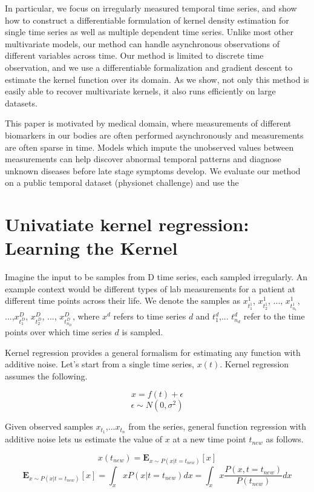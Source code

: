 \documentclass{article} %
\begin{document}
In particular, we focus on irregularly measured temporal time series, and show how to construct a differentiable formulation of kernel density estimation for single time series as well as multiple dependent time series. Unlike most other multivariate models, our method can handle asynchronous observations of different variables across time. Our method is limited to discrete time observation, and we use a differentiable formalization and gradient descent to estimate the kernel function over its domain. As we show, not only this method is easily able to recover multivariate kernels, it also runs efficiently on large datasets.  

This paper is motivated by medical domain, where measurements of different biomarkers in our bodies are often performed asynchronously and measurements are often sparse in time. Models which impute the unobserved values between measurements can help discover abnormal temporal patterns and diagnose unknown diseases before late stage symptoms develop. We evaluate our method on a public temporal dataset (physionet challenge) and use the 

\section{Univatiate kernel regression: Learning the Kernel}
Imagine the input to be samples from D time series, each sampled irregularly. An example context would be different types of lab measurements for a patient at different time points across their life. We denote the samples as ${x^1_{t^1_1}}$, ${x^1_{t^1_2}}$, ..., ${x^1_{t^1_{n_1}}}$, ...,${x^D_{t^D_1}}$, ${x^D_{t^D_2}}$, ..., ${x^D_{t^D_{n_D}}}$, where $x^d$ refers to time series $d$ and $t^d_1$,... $t^d_{n_d}$ refer to the time points over which time series $d$ is sampled. 

Kernel regression provides a general formalism for estimating any function with additive noise. Let's start from a single time series, $x(t)$. Kernel regression assumes the following.

$$ x = f(t) + \epsilon $$
$$\epsilon \sim N(0,\sigma^2)$$

Given observed samples $x_{t_1}$,...$x_{t_n}$ from the series, general function regression with additive noise lets us estimate the value of $x$ at a new time point $t_{new}$ as follows. 

$$x(t_{new}) = \mathbf{E}_{x \sim P(x|t=t_{new})}[x] $$
$$\mathbf{E}_{x \sim P(x|t=t_{new})}[x] = \int_x x P(x|t=t_{new}) dx =\int_x x \frac{P(x , t=t_{new})}{P(t_{new})} dx $$
\end{document}
